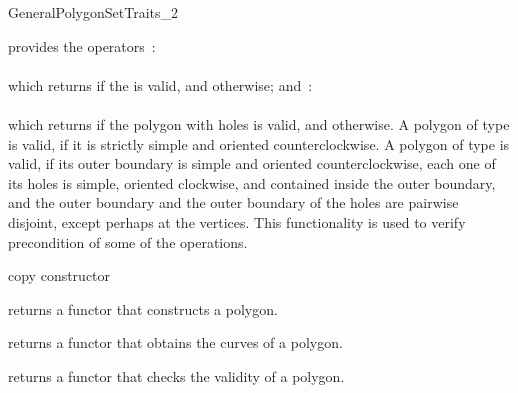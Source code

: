 \begin{ccRefConcept}{GeneralPolygonSetTraits_2}
  
{provides the operators~: \\
  \\
 which returns  if the  is valid, and 
 otherwise; and~: \\
  \\
 which returns  if the polygon with holes  
 is valid, and  otherwise.
 A polygon of type  is valid, if it is strictly simple 
 and oriented counterclockwise.
 A polygon of type  is valid, 
 if its outer boundary is simple and oriented counterclockwise, each one of 
 its holes is simple, oriented clockwise, and contained inside the outer 
 boundary, and the outer boundary and the outer boundary of the holes are 
 pairwise disjoint, except perhaps at the vertices. This functionality is 
 used to verify precondition of some of the operations.}

\ccCreation
{}

\ccGlue
{}
{copy constructor}
\ccGlue
{}



{returns a functor that constructs a polygon.}

{returns a functor that obtains the curves of a polygon.}

{returns a functor that checks the validity of a polygon.}


\ccHasModels
\\
\\

\ccSeeAlso

\end{ccRefConcept}

\ccRefPageEnd
